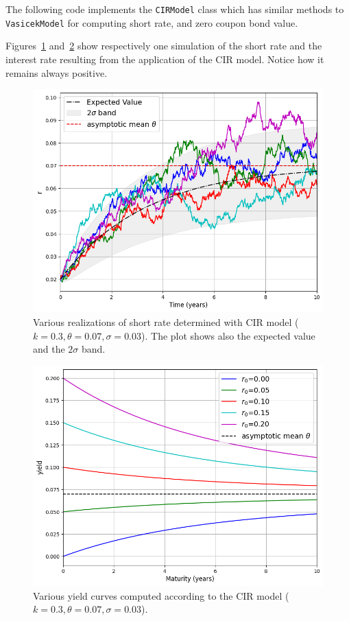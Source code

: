 \begin{finmarkets}
The following code implements the \texttt{CIRModel} class which has similar methods to \texttt{VasicekModel} for computing short rate, and zero coupon bond value.
\end{finmarkets}


Figures~\ref{fig:cir_path} and~\ref{fig:cir_yields} show respectively one simulation of the short rate and the interest rate resulting from the application of the CIR model. Notice how it remains always positive.

\begin{figure}[htb]
\centering
\includegraphics[width=0.7\linewidth]{figures/cir_short_rate}
\caption{Various realizations of short rate determined with CIR model ($k=0.3, \theta=0.07, \sigma=0.03$). The plot shows also the expected value and the $2\sigma$ band.}
\label{fig:cir_path}
\end{figure}

\begin{figure}[htb]
\centering
\includegraphics[width=0.7\linewidth]{figures/cir_yields}
\caption{Various yield curves computed according to the CIR model ($k=0.3, \theta=0.07, \sigma=0.03$).}
\label{fig:cir_yields}
\end{figure}

